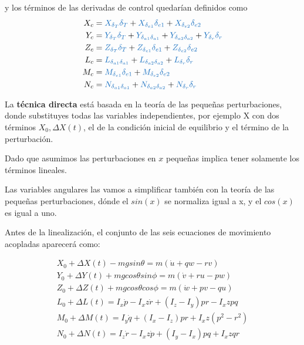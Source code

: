 y los términos de las derivadas de control quedarían definidos como
\begin{align}
\label{eq: entradas de control lineal}
X_c &= \textcolor{RoyalBlue}{X_{\delta_T} \delta_T}  + \textcolor{RoyalBlue}{X_{\delta_{e1}} \delta_{e1}} + \textcolor{RoyalBlue}{X_{\delta_{e2}} \delta_{e2}}  \\
Y_c &= \textcolor{RoyalBlue}{Y_{\delta_T} \delta_T}  + \textcolor{RoyalBlue}{Y_{\delta_{a1}\delta_{a1}}} + \textcolor{RoyalBlue}{Y_{\delta_{a2}\delta_{a2}}} + \textcolor{RoyalBlue}{Y_{\delta_{r}}\delta_{r}} \\
Z_c &= \textcolor{RoyalBlue}{Z_{\delta_T} \delta_T}  + \textcolor{RoyalBlue}{Z_{\delta_{e1}} \delta_{e1}} + \textcolor{RoyalBlue}{Z_{\delta_{e2}} \delta_{e2}}  \\
L_c &= \textcolor{RoyalBlue}{L_{\delta_{a1}\delta_{a1}}} + \textcolor{RoyalBlue}{L_{\delta_{a2}\delta_{a2}}} + \textcolor{RoyalBlue}{L_{\delta_{r}}\delta_{r}} \\
M_c &= \textcolor{RoyalBlue}{M_{\delta_{e1}} \delta_{e1}} + \textcolor{RoyalBlue}{M_{\delta_{e2}} \delta_{e2}} \\
N_c &= \textcolor{RoyalBlue}{N_{\delta_{a1}\delta_{a1}}} + \textcolor{RoyalBlue}{N_{\delta_{a2}\delta_{a2}}} + \textcolor{RoyalBlue}{N_{\delta_{r}}\delta_{r}}
\end{align}



La \textbf{técnica directa} está basada en la teoría de las pequeñas perturbaciones, donde substituyes todas las variables independientes, por ejemplo X con dos términos $X_0,\Delta X(t)$, el de la condición inicial de equilibrio y el término de la perturbación. 

Dado que asumimos las perturbaciones en $x$ pequeñas implica tener solamente los términos lineales. 

Las variables angulares las vamos a simplificar también con la teoría de las pequeñas perturbaciones, dónde el $sin(x)$ se normaliza igual a x, y el $cos(x)$ es igual a uno.  

Antes de la linealización, el conjunto de las seis ecuaciones de movimiento acopladas aparecerá como:

\begin{gather}
    X_0 + \Delta X(t) - mg sin\theta = m(\dot u + qw - rv) \\
    Y_0 + \Delta Y(t) + mg cos\theta sin\phi = m (\dot v + ru - pw) \\
    Z_0 + \Delta Z(t) + mg cos\theta cos \phi = m ( \dot w + pv - qu) \\
    L_0 + \Delta L(t) = I_x \dot p - I_xz \dot r + (I_z - I_y)pr - I_xz pq \\
    M_0 + \Delta M(t) = I_y \dot q + (I_x - I_z) pr + I_xz (p^2 - r^2) \\
    N_0 + \Delta N(t) = I_z \dot r - I_xz \dot p + (I_y - I_x)pq + I_xz qr
\end{gather}


